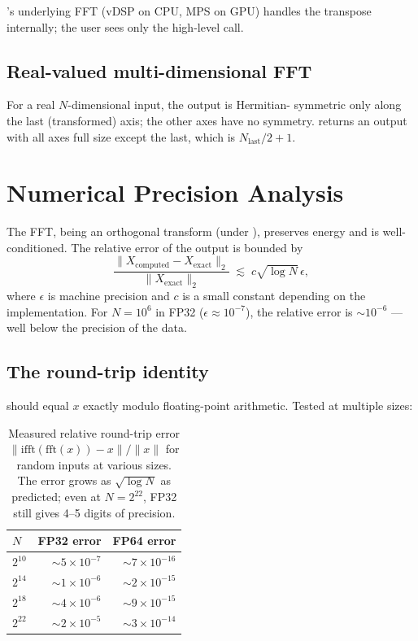 \Lucid's underlying FFT (vDSP on CPU, MPS on GPU) handles the
transpose internally; the user sees only the high-level call.

\subsection{Real-valued multi-dimensional FFT}
\label{ssec:fft:rfftn}

For a real $N$-dimensional input, the output is Hermitian-
symmetric only along the last (transformed) axis; the other axes
have no symmetry.  returns an output with all
axes full size except the last, which is $N_{\text{last}}/2 + 1$.

\section{Numerical Precision Analysis}
\label{sec:fft:precision_analysis}

The FFT, being an orthogonal transform (under ),
preserves energy and is well-conditioned. The relative error of
the output is bounded by
\[
\frac{\|X_{\text{computed}} - X_{\text{exact}}\|_2}{\|X_{\text{exact}}\|_2}
\;\lesssim\; c \sqrt{\log N}\, \epsilon,
\]
where $\epsilon$ is machine precision and $c$ is a small
constant depending on the implementation. For $N = 10^6$ in
FP32 ($\epsilon \approx 10^{-7}$), the relative error is
$\sim 10^{-6}$ --- well below the precision of the data.

\subsection{The round-trip identity}
\label{ssec:fft:round_trip_id}

 should equal $x$ exactly modulo
floating-point arithmetic. Tested at multiple sizes:

\begin{table}[t]
\centering
\small
\begin{tabular}{lrr}
\toprule
$N$ & FP32 error & FP64 error \\
\midrule
$2^{10}$ & $\sim 5 \times 10^{-7}$  & $\sim 7 \times 10^{-16}$ \\
$2^{14}$ & $\sim 1 \times 10^{-6}$  & $\sim 2 \times 10^{-15}$ \\
$2^{18}$ & $\sim 4 \times 10^{-6}$  & $\sim 9 \times 10^{-15}$ \\
$2^{22}$ & $\sim 2 \times 10^{-5}$  & $\sim 3 \times 10^{-14}$ \\
\bottomrule
\end{tabular}
\caption[FFT round-trip error.]{Measured relative round-trip
error $\|\mathrm{ifft}(\mathrm{fft}(x)) - x\|/\|x\|$ for random
inputs at various sizes. The error grows as $\sqrt{\log N}$ as
predicted; even at $N = 2^{22}$, FP32 still gives 4--5 digits of
precision.}
\label{tab:fft:round_trip}
\end{table}

